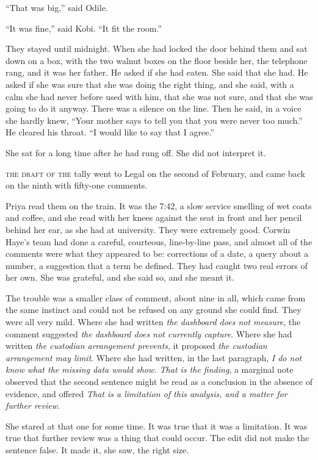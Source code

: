 ``That was big,'' said Odile.

``It was fine,'' said Kobi. ``It fit the room.''

They stayed until midnight. When she had locked the door behind them and sat down on a box, with the two walnut boxes on the floor beside her, the telephone rang, and it was her father. He asked if she had eaten. She said that she had. He asked if she was sure that she was doing the right thing, and she said, with a calm she had never before used with him, that she was not sure, and that she was going to do it anyway. There was a silence on the line. Then he said, in a voice she hardly knew, ``Your mother says to tell you that you were never too much.'' He cleared his throat. ``I would like to say that I agree.''

She sat for a long time after he had rung off. She did not interpret it.


\textsc{the draft of the} tally went to Legal on the second of February, and came back on the ninth with fifty-one comments.

Priya read them on the train. It was the 7:42, a slow service smelling of wet coats and coffee, and she read with her knees against the seat in front and her pencil behind her ear, as she had at university. They were extremely good. Corwin Haye's team had done a careful, courteous, line-by-line pass, and almost all of the comments were what they appeared to be: corrections of a date, a query about a number, a suggestion that a term be defined. They had caught two real errors of her own. She was grateful, and she said so, and she meant it.

The trouble was a smaller class of comment, about nine in all, which came from the same instinct and could not be refused on any ground she could find. They were all very mild. Where she had written \emph{the dashboard does not measure}, the comment suggested \emph{the dashboard does not currently capture}. Where she had written \emph{the custodian arrangement prevents}, it proposed \emph{the custodian arrangement may limit}. Where she had written, in the last paragraph, \emph{I do not know what the missing data would show. That is the finding}, a marginal note observed that the second sentence might be read as a conclusion in the absence of evidence, and offered \emph{That is a limitation of this analysis, and a matter for further review.}

She stared at that one for some time. It was true that it was a limitation. It was true that further review was a thing that could occur. The edit did not make the sentence false. It made it, she saw, the right size.

